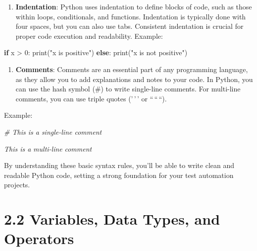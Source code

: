 \documentclass[
  paper=a4,
  ,captions=tableheading
]{scrartcl}
\newenvironment{Shaded}{}{}
\newcommand{\BuiltInTok}[1]{\textcolor[rgb]{0.00,0.50,0.00}{#1}}
\newcommand{\CommentTok}[1]{\textcolor[rgb]{0.38,0.63,0.69}{\textit{#1}}}
\newcommand{\ControlFlowTok}[1]{\textcolor[rgb]{0.00,0.44,0.13}{\textbf{#1}}}
\newcommand{\DecValTok}[1]{\textcolor[rgb]{0.25,0.63,0.44}{#1}}
\newcommand{\NormalTok}[1]{#1}
\newcommand{\OperatorTok}[1]{\textcolor[rgb]{0.40,0.40,0.40}{#1}}
\newcommand{\StringTok}[1]{\textcolor[rgb]{0.25,0.44,0.63}{#1}}
\providecommand{\tightlist}{%
  \setlength{\itemsep}{0pt}\setlength{\parskip}{0pt}}
\begin{document}
\begin{enumerate}
\def\labelenumi{\arabic{enumi}.}
\tightlist
\item
  \textbf{Indentation}: Python uses indentation to define blocks of
  code, such as those within loops, conditionals, and functions.
  Indentation is typically done with four spaces, but you can also use
  tabs. Consistent indentation is crucial for proper code execution and
  readability. Example:
\end{enumerate}

\begin{Shaded}
\begin{Highlighting}[]
\ControlFlowTok{if}\NormalTok{ x }\OperatorTok{\textgreater{}} \DecValTok{0}\NormalTok{:}
    \BuiltInTok{print}\NormalTok{(}\StringTok{"x is positive"}\NormalTok{)}
\ControlFlowTok{else}\NormalTok{:}
    \BuiltInTok{print}\NormalTok{(}\StringTok{"x is not positive"}\NormalTok{)}
\end{Highlighting}
\end{Shaded}

\begin{enumerate}
\def\labelenumi{\arabic{enumi}.}
\tightlist
\item
  \textbf{Comments}: Comments are an essential part of any programming
  language, as they allow you to add explanations and notes to your
  code. In Python, you can use the hash symbol (\#) to write single-line
  comments. For multi-line comments, you can use triple quotes ('\,'\,'
  or ``\,``\,``).
\end{enumerate}

Example:

\begin{Shaded}
\begin{Highlighting}[]
\CommentTok{\# This is a single{-}line comment}

\CommentTok{\textquotesingle{}\textquotesingle{}\textquotesingle{}}
\CommentTok{This is a}
\CommentTok{multi{-}line}
\CommentTok{comment}
\CommentTok{\textquotesingle{}\textquotesingle{}\textquotesingle{}}
\end{Highlighting}
\end{Shaded}

By understanding these basic syntax rules, you'll be able to write clean
and readable Python code, setting a strong foundation for your test
automation projects.

\hypertarget{variables-data-types-and-operators}{%
\section{2.2 Variables, Data Types, and
Operators}\label{variables-data-types-and-operators}}
\end{document}
